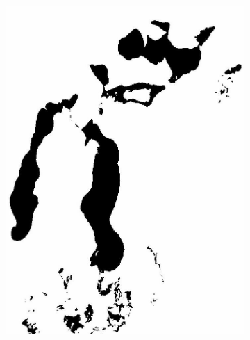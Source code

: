 \documentclass[12pt,a4paper]{article}
\begin{document}
\begin{figure}
\begin{subfigure}[b]{0.19\textwidth}
        \includegraphics[width=\textwidth]{../img/2010w.jpg}
    \end{subfigure}
    \begin{subfigure}[b]{0.19\textwidth}
        \centering

\end{subfigure}
\end{figure}
\end{document}
